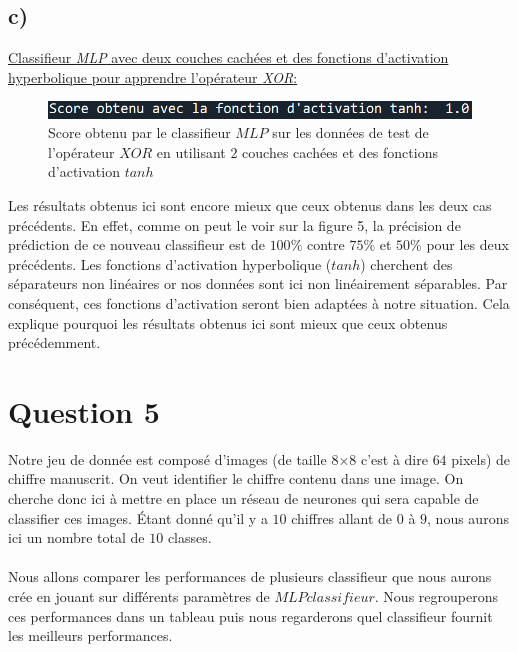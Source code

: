 \documentclass[frenchb]{report}
\newcommand{\1}{\mathbbm{1}}
\theoremstyle{definition}\newtheorem{defn}{Définition}
\theoremstyle{definition}\newtheorem{exm}{Exemple}
\theoremstyle{definition}\newtheorem{nota}{Notation}
\theoremstyle{definition}\newtheorem{rem}{Remarque}
\begin{document}
\subsection{c)}

\underline{Classifieur \textit{MLP} avec deux couches cachées et des fonctions d'activation hyperbolique pour apprendre l’opérateur \textit{XOR}:}

\begin{figure}[H]
	\centering
	\includegraphics[scale=0.7]{images/Q4c.png}
	\caption{Score obtenu par le classifieur $MLP$ sur les données de test de l'opérateur $XOR$ en utilisant $2$ couches cachées et des fonctions d'activation $tanh$}
\end{figure}
Les résultats obtenus ici sont encore mieux que ceux obtenus dans les deux cas précédents. En effet, comme on peut le voir sur la figure 5, la précision de prédiction de ce nouveau classifieur est de $100\%$ contre $75\%$ et $50\%$ pour les deux précédents.
Les fonctions d'activation hyperbolique ($tanh$) cherchent des séparateurs non linéaires or nos données sont ici non linéairement séparables. Par conséquent, ces fonctions d'activation seront bien adaptées à notre situation. Cela explique pourquoi les résultats obtenus ici sont mieux que ceux obtenus précédemment.

\section*{Question 5}


Notre jeu de donnée est composé d'images (de taille 8$\times$8 c'est à dire $64$ pixels) de chiffre manuscrit. On veut identifier le chiffre contenu dans une image. On cherche donc ici à mettre en place un réseau de neurones qui sera capable de classifier ces images. Étant donné qu'il y a $10$ chiffres allant de $0$ à $9$, nous aurons ici un nombre total de $10$ classes.\\\\

Nous allons comparer les performances de plusieurs classifieur que nous aurons crée en jouant sur différents paramètres de $MLPclassifieur$. Nous regrouperons ces performances dans un tableau puis nous regarderons quel classifieur fournit les meilleurs performances.
\end{document}
